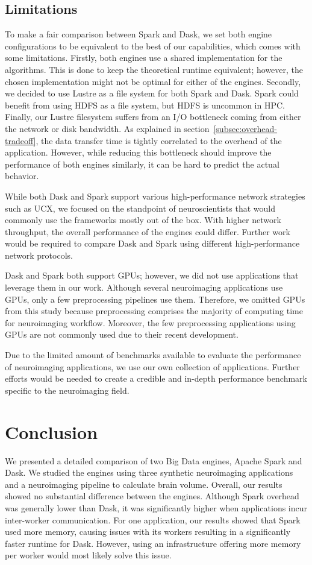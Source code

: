 \documentclass[AMA,STIX1COL]{WileyNJD-v2}
\newcommand{\HL}[1]{#1}
\begin{document}
\subsection{Limitations}
To make a fair comparison between Spark and Dask, we set both engine configurations
to be equivalent to the best of our capabilities, which comes with some limitations.
Firstly, both engines use a shared implementation for the algorithms.
This is done to keep the theoretical runtime equivalent; however, the chosen
implementation might not be optimal for either of the engines.
Secondly, we decided to use Lustre as a file system for both Spark and Dask.
Spark could benefit from using HDFS as a file system, but HDFS is uncommon in HPC.
\HL{Finally, our Lustre filesystem suffers from an I/O bottleneck coming from 
either the network or disk bandwidth.}
As explained in section~{\ref{subsec:overhead-tradeoff}}, the data transfer 
time is tightly correlated to the overhead of the application.
However, while reducing this bottleneck should improve the performance of 
both engines similarly, it can be hard to predict the actual behavior.

\HL{
	While both Dask and Spark support various high-performance network strategies
	such as UCX, we focused on the standpoint of neuroscientists that would 
	commonly use the frameworks mostly out of the box.
	With higher network throughput, the overall performance of the engines could differ.
	Further work would be required to compare Dask and Spark using different high-performance
	network protocols.
}
			
\HL{
	Dask and Spark both support GPUs; however, we did not use applications that
	leverage them in our work.
	Although several neuroimaging applications use GPUs, only a few preprocessing pipelines use them.
	Therefore, we omitted GPUs from this study because preprocessing comprises the majority of computing time for neuroimaging
	workflow.
	Moreover, the few preprocessing applications using GPUs are not commonly used
	due to their recent development.
}

\HL{
	Due to the limited amount of benchmarks available to evaluate the performance
	of neuroimaging applications, we use our own collection of applications.
	Further efforts would be needed to create a credible and in-depth performance
	benchmark specific to the neuroimaging field.
}
											
\section{Conclusion}
We presented a detailed comparison of two Big Data engines, Apache Spark and Dask.
We studied the engines using three synthetic \HL{neuroimaging} applications and 
a neuroimaging pipeline \HL{to calculate brain volume.}
Overall, our results showed no substantial difference between the engines.
Although Spark overhead was generally lower than Dask, it was significantly higher when applications incur inter-worker communication.
For one application, our results showed that Spark used more memory, causing issues with its workers resulting in a significantly faster runtime for Dask.
However, using an infrastructure offering more memory per worker would most likely solve this issue.
																					
\end{document}

